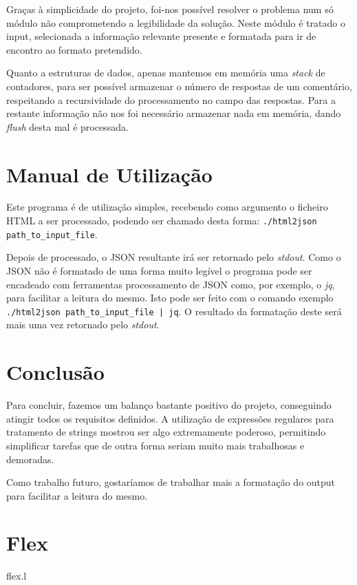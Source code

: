 \documentclass[a4paper]{report}
\begin{document}
Graças à simplicidade do projeto, foi-nos possível resolver o problema num
só módulo não comprometendo a legibilidade da solução. Neste módulo é tratado
o input, selecionada a informação relevante presente e formatada para ir de
encontro ao formato pretendido.

Quanto a estruturas de dados, apenas mantemos em memória uma \textit{stack}
de contadores, para ser possível armazenar o número de respostas de um
comentário, respeitando a recursividade do processamento no campo das respostas.
Para a restante informação não nos foi necessário armazenar nada em memória,
dando \textit{flush} desta mal é processada.

\chapter{Manual de Utilização}

Este programa é de utilização simples, recebendo como argumento o ficheiro
HTML a ser processado, podendo ser chamado desta forma: 
\verb!./html2json path_to_input_file!.

Depois de processado, o JSON resultante irá ser retornado pelo \textit{stdout}.
Como o JSON não é formatado de uma forma muito legível o programa pode ser
encadeado com ferramentas processamento de JSON como, por exemplo, o \textit{jq},
para facilitar a leitura do mesmo. Isto pode ser feito com o comando exemplo
\verb!./html2json path_to_input_file | jq!. O resultado da formatação deste
será mais uma vez retornado pelo \textit{stdout}.

\chapter{Conclusão}

Para concluir, fazemos um balanço bastante positivo do projeto, conseguindo
atingir todos os requisitos definidos. A utilização de expressões regulares
para tratamento de strings mostrou ser algo extremamente poderoso, permitindo
simplificar tarefas que de outra forma seriam muito mais trabalhosas e demoradas.

Como trabalho futuro, gostaríamos de trabalhar mais a formatação do output
para facilitar a leitura do mesmo.

\appendix

\chapter{Flex}


{flex.l}
\end{document}
